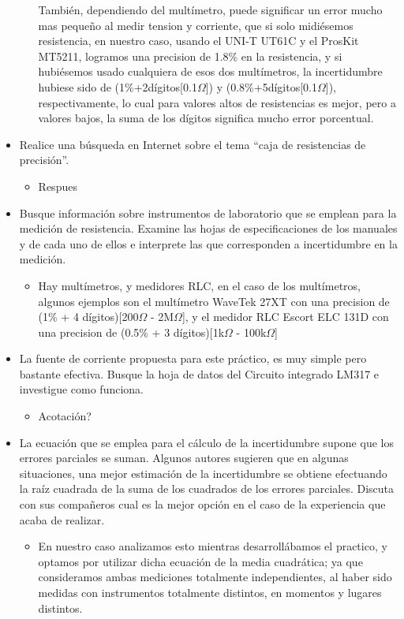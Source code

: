 \begin{itemize}
\begin{itemize}
        También, dependiendo del multímetro, puede significar un error mucho mas pequeño al medir tension y corriente, que si solo midiésemos resistencia, en nuestro caso, usando el UNI-T UT61C y el ProsKit MT5211, logramos una precision de 1.8\% en la resistencia, y si hubiésemos usado cualquiera de esos dos multímetros, la incertidumbre hubiese sido de (1\%+2dígitos[0.1$\Omega$]) y (0.8\%+5dígitos[0.1$\Omega$]), respectivamente, lo cual para valores altos de resistencias es mejor, pero a valores bajos, la suma de los dígitos significa mucho error porcentual.
    \end{itemize}
  \item Realice una búsqueda en Internet sobre el tema “caja de resistencias de precisión”.
    \begin{itemize}
      \item Respues
    \end{itemize}
  \item Busque información sobre instrumentos de laboratorio que se emplean para la medición de resistencia. Examine las hojas de especificaciones de los manuales y de cada uno de ellos e interprete las que corresponden a incertidumbre en la medición.
    \begin{itemize}
      \item Hay multímetros, y medidores RLC, en el caso de los multímetros, algunos ejemplos son el multímetro WaveTek 27XT con una precision de (1\% + 4 dígitos)[200$\Omega$ - 2M$\Omega$], y el medidor RLC Escort ELC 131D con una precision de (0.5\% + 3 dígitos)[1k$\Omega$ - 100k$\Omega$]
    \end{itemize}
  \item La fuente de corriente propuesta para este práctico, es muy simple pero bastante efectiva. Busque la hoja de datos del Circuito integrado LM317 e investigue como funciona.
    \begin{itemize}
      \item Acotación?
    \end{itemize}
  \item La ecuación que se emplea para el cálculo de la incertidumbre supone que los errores parciales se suman. Algunos autores sugieren que en algunas situaciones, una mejor estimación de la incertidumbre se obtiene efectuando la raíz cuadrada de la suma de los cuadrados de los errores parciales. Discuta con sus compañeros cual es la mejor opción en el caso de la experiencia que acaba de realizar. 
    \begin{itemize}
      \item En nuestro caso analizamos esto mientras desarrollábamos el practico, y optamos por utilizar dicha ecuación de la media cuadrática; ya que consideramos ambas mediciones totalmente independientes, al haber sido medidas con instrumentos totalmente distintos, en momentos y lugares distintos.
    \end{itemize}
\end{itemize}
